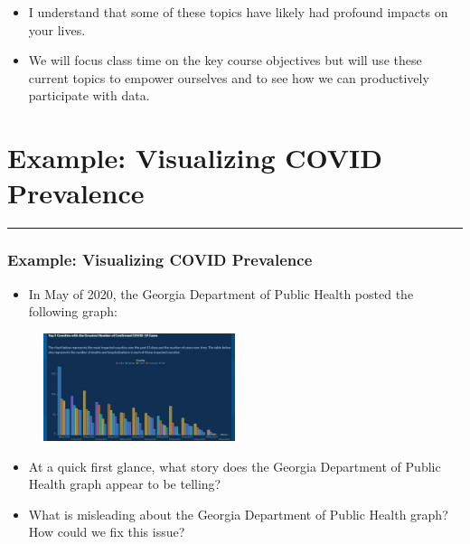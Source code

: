 \documentclass[
  letterpaper,
  DIV=11,
  numbers=noendperiod]{scrartcl}
\providecommand{\tightlist}{%
  \setlength{\itemsep}{0pt}\setlength{\parskip}{0pt}}\usepackage{longtable,booktabs,array}
\begin{document}
\begin{itemize}
\item
  I understand that some of these topics have likely had profound
  impacts on your lives.
\item
  We will focus class time on the key course objectives but will use
  these current topics to empower ourselves and to see how we can
  productively participate with data.
\end{itemize}

\hypertarget{example-visualizing-covid-prevalence}{%
\section{Example: Visualizing COVID
Prevalence}\label{example-visualizing-covid-prevalence}}

\begin{center}\rule{0.5\linewidth}{0.5pt}\end{center}

\hypertarget{example-visualizing-covid-prevalence-1}{%
\subsubsection{Example: Visualizing COVID
Prevalence}\label{example-visualizing-covid-prevalence-1}}

\begin{itemize}
\tightlist
\item
  In May of 2020, the Georgia Department of Public Health posted the
  following graph:
\end{itemize}

\begin{figure}

{\centering \includegraphics[width=0.5\textwidth,height=\textheight]{img/GAcovid.jpg}

}

\end{figure}

\begin{itemize}
\item
  At a quick first glance, what story does the Georgia Department of
  Public Health graph appear to be telling?
\item
  What is misleading about the Georgia Department of Public Health
  graph? How could we fix this issue?
\end{itemize}
\end{document}
